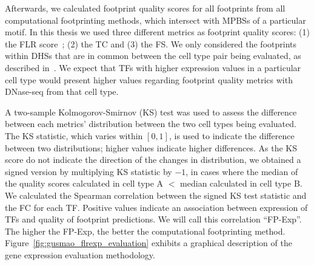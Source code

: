 Afterwards, we calculated footprint quality scores for all footprints from all computational footprinting methods, which intersect with MPBSs of a particular motif. In this thesis we used three different metrics as footprint quality scores: (1) the FLR score~\citep{yardimci2014}; (2) the TC and (3) the FS. We only considered the footprints within DHSs that are in common between the cell type pair being evaluated, as described in~\cite{yardimci2014}. We expect that TFs with higher expression values in a particular cell type would present higher values regarding footprint quality metrics with DNase-seq from that cell type.

A two-sample Kolmogorov-Smirnov (KS) test was used to assess the difference between each metrics' distribution between the two cell types being evaluated. The KS statistic, which varies within $[0,1]$, is used to indicate the difference between two distributions; higher values indicate higher differences. As the KS score do not indicate the direction of the changes in distribution, we obtained a signed version by multiplying KS statistic by $-1$, in cases where the median of the quality scores calculated in cell type A $<$ median calculated in cell type B. We calculated the Spearman correlation between the signed KS test statistic and the FC for each TF. Positive values indicate an association between expression of TFs and quality of footprint predictions. We will call this correlation ``FP-Exp''. The higher the FP-Exp, the better the computational footprinting method. Figure~\ref{fig:gusmao_flrexp_evaluation} exhibits a graphical description of the gene expression evaluation methodology.

